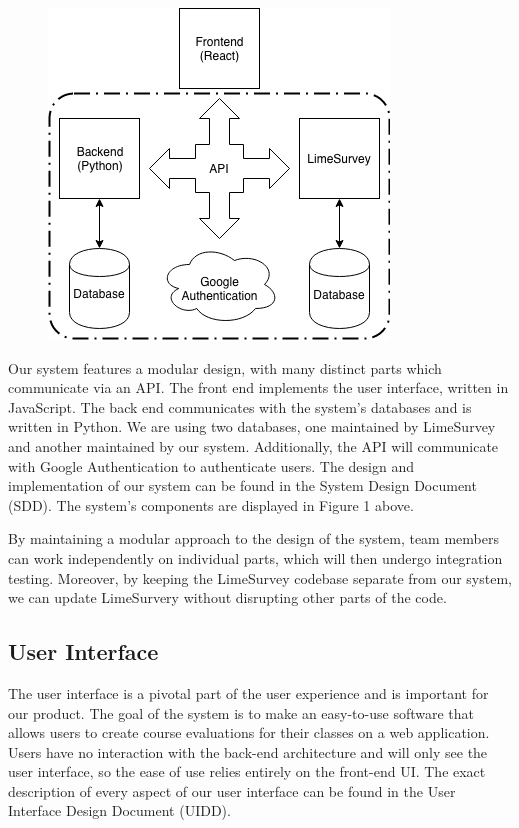 \documentclass{article}
\begin{document}
\begin{center}
\begin{figure}[H]
\centering
\vspace{2mm}
\label{fig:componentdiagram}
{\includegraphics[scale=.75]{images/component_diagram.png}}
\end{figure}
\end{center}

Our system features a modular design, with many distinct parts which communicate via an API. The front end implements the user interface, written in JavaScript. The back end communicates with the system's databases and is written in Python. We are using two databases, one maintained by LimeSurvey and another maintained by our system. Additionally, the API will communicate with Google Authentication to authenticate users. The design and implementation of our system can be found in the System Design Document (SDD). The system's components are displayed in Figure 1 above.

By maintaining a modular approach to the design of the system, team members can work independently on individual parts, which will then undergo integration testing. Moreover, by keeping the LimeSurvey codebase separate from our system, we can update LimeSurvery without disrupting other parts of the code. 

\subsection{User Interface}

The user interface is a pivotal part of the user experience and is important for our product. The goal of the system is to make an easy-to-use software that allows users to create course evaluations for their classes on a web application.  Users have no interaction with the back-end architecture and will only see the user interface, so the ease of use relies entirely on the front-end UI.  The exact description of every aspect of our user interface can be found in the User Interface Design Document (UIDD). 
\end{document}
